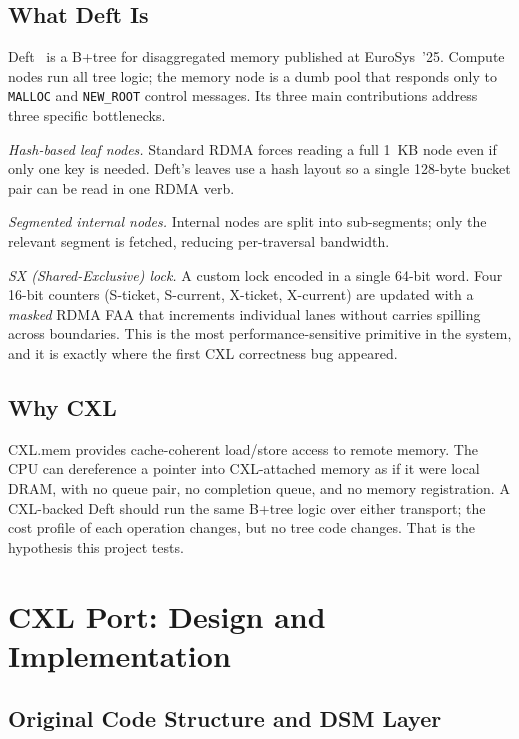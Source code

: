 \documentclass[10pt,twocolumn]{article}
\begin{document}
\subsection{What Deft Is}

Deft~\cite{deft2025eurosys} is a B+tree for disaggregated memory published at
EuroSys~'25.
Compute nodes run all tree logic; the memory node is a dumb pool that responds
only to \texttt{MALLOC} and \texttt{NEW\_ROOT} control messages.
Its three main contributions address three specific bottlenecks.

\textit{Hash-based leaf nodes.}
Standard RDMA forces reading a full 1~KB node even if only one key is needed.
Deft's leaves use a hash layout so a single 128-byte bucket pair can be read in
one RDMA verb.

\textit{Segmented internal nodes.}
Internal nodes are split into sub-segments; only the relevant segment is
fetched, reducing per-traversal bandwidth.

\textit{SX (Shared-Exclusive) lock.}
A custom lock encoded in a single 64-bit word.
Four 16-bit counters (S-ticket, S-current, X-ticket, X-current) are updated
with a \emph{masked} RDMA FAA that increments individual lanes without carries
spilling across boundaries.
This is the most performance-sensitive primitive in the system, and it is
exactly where the first CXL correctness bug appeared.

\subsection{Why CXL}

CXL.mem provides cache-coherent load/store access to remote memory.
The CPU can dereference a pointer into CXL-attached memory as if it were local
DRAM, with no queue pair, no completion queue, and no memory registration.
A CXL-backed Deft should run the same B+tree logic over either transport;
the cost profile of each operation changes, but no tree code changes.
That is the hypothesis this project tests.

\section{CXL Port: Design and Implementation}

\subsection{Original Code Structure and DSM Layer}
\end{document}
